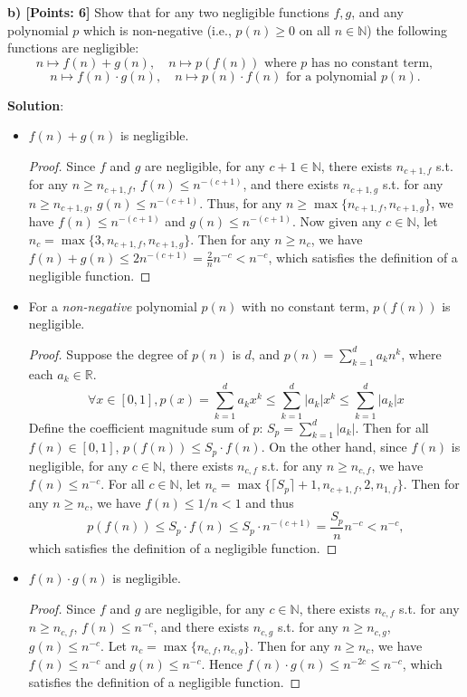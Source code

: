 \documentclass[12pt]{article}
\newcommand{\N}{\mathbb{N}}
\newcommand{\R}{\mathbb{R}}
\theoremstyle{definition}
\begin{document}
{\bf b) [Points: 6]} Show that for any two negligible functions $f, g$, and any polynomial $p$ which is non-negative (i.e., $p(n)\geq 0$ on all $n\in\N$) the following functions are negligible:
$$n \mapsto f(n)+g(n), \quad n \mapsto p(f(n)) \textrm{ where $p$ has no constant term},$$
$$n \mapsto f(n)\cdot g(n), \quad n \mapsto p(n)\cdot f(n) \textrm{ for a polynomial $p(n)$}.$$

{\bf Solution}:
\begin{itemize}
\item $f(n)+g(n)$ is negligible.
\begin{proof}
Since $f$ and $g$ are negligible, for any $c+1\in \N$, there exists $n_{c+1,f}$ s.t. for any $n\geq n_{c+1,f}$, $f(n) \leq n^{-(c+1)}$, and there exists $n_{c+1,g}$ s.t. for any $n\geq n_{c+1,g}$, $g(n) \leq n^{-(c+1)}$. Thus, for any $n\geq \max\{n_{c+1,f}, n_{c+1,g}\}$, we have $f(n) \leq n^{-(c+1)}$ and $g(n) \leq n^{-(c+1)}$. Now given any $c\in\N$, let $n_c = \max\{3, n_{c+1,f}, n_{c+1,g}\}$. Then for any $n\geq n_c$, we have $f(n)+g(n) \leq 2n^{-(c+1)} = \frac{2}{n}n^{-c} < n^{-c}$, which satisfies the definition of a negligible function.
\end{proof}

\item For a \emph{non-negative} polynomial $p(n)$ with no constant term, $p(f(n))$ is negligible.
\begin{proof}
Suppose the degree of $p(n)$ is $d$, and $p(n) = \sum_{k=1}^d a_kn^k$, where each $a_k\in\R$. 
$$\forall x\in [0,1], p(x) = \sum_{k=1}^d a_kx^k \leq \sum_{k=1}^d |a_k|x^k \leq \sum_{k=1}^d |a_k|x$$
Define the coefficient magnitude sum of $p$: $S_p = \sum_{k=1}^d |a_k|$. Then for all $f(n)\in[0,1]$, $p(f(n)) \leq S_p \cdot f(n)$.
On the other hand, since $f(n)$ is negligible, for any $c\in\N$, there exists $n_{c,f}$ s.t. for any $n\geq n_{c,f}$, we have $f(n)\leq n^{-c}$. 
For all $c\in\N$, let $n_c = \max\{\lceil S_p \rceil+1, n_{c+1,f}, 2, n_{1,f}\}$. Then for any $n\geq n_c$, we have $f(n)\leq 1/n<1$ and thus
$$p(f(n)) \leq S_p \cdot f(n) \leq S_p \cdot n^{-(c+1)} = \frac{S_p}{n}n^{-c} < n^{-c},$$
which satisfies the definition of a negligible function.
\end{proof}

\item $f(n)\cdot g(n)$ is negligible.
\begin{proof}
Since $f$ and $g$ are negligible, for any $c\in \N$, there exists $n_{c,f}$ s.t. for any $n\geq n_{c,f}$, $f(n) \leq n^{-c}$, and there exists $n_{c,g}$ s.t. for any $n\geq n_{c,g}$, $g(n) \leq n^{-c}$. Let $n_c = \max\{n_{c,f}, n_{c,g}\}$. Then for any $n\geq n_c$, we have $f(n) \leq n^{-c}$ and $g(n) \leq n^{-c}$. Hence $f(n)\cdot g(n) \leq n^{-2c} \leq n^{-c}$, which satisfies the definition of a negligible function.
\end{proof}


\end{itemize}
\end{document}
